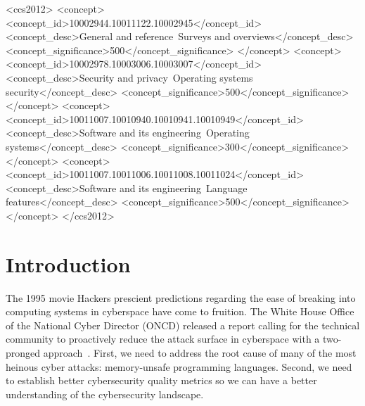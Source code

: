 \documentclass[sigconf]{acmart}
\begin{document}
\begin{CCSXML}
<ccs2012>
   <concept>
       <concept_id>10002944.10011122.10002945</concept_id>
       <concept_desc>General and reference~Surveys and overviews</concept_desc>
       <concept_significance>500</concept_significance>
       </concept>
   <concept>
       <concept_id>10002978.10003006.10003007</concept_id>
       <concept_desc>Security and privacy~Operating systems security</concept_desc>
       <concept_significance>500</concept_significance>
       </concept>
   <concept>
       <concept_id>10011007.10010940.10010941.10010949</concept_id>
       <concept_desc>Software and its engineering~Operating systems</concept_desc>
       <concept_significance>300</concept_significance>
       </concept>
   <concept>
       <concept_id>10011007.10011006.10011008.10011024</concept_id>
       <concept_desc>Software and its engineering~Language features</concept_desc>
       <concept_significance>500</concept_significance>
       </concept>
 </ccs2012>
\end{CCSXML}






\maketitle

\section{Introduction}

The 1995 movie Hackers prescient predictions regarding the ease
of breaking into computing systems in cyberspace have come to fruition. The White House Office of
the National Cyber Director (ONCD) released a report calling for the technical community to
proactively reduce the attack surface in cyberspace with a two-pronged approach~\cite{United_States_Gov2024-pp}. First, we need to
address the root cause of many of the most heinous cyber attacks: memory-unsafe programming
languages. Second, we need to establish better cybersecurity quality
metrics so we can have a better understanding of the cybersecurity landscape.
\end{document}

